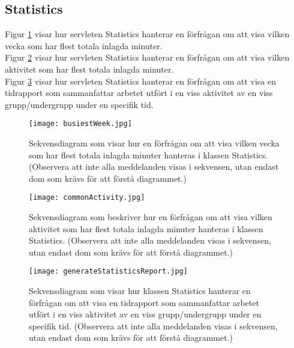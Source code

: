 \documentclass[a4paper]{article}
\begin{document}
\subsection{Statistics}
Figur \ref{busiestWeek} visar hur servleten Statistics hanterar en förfrågan om att visa vilken vecka som har flest totala inlagda minuter.\\
Figur \ref{commonActivity} visar hur servleten Statistics hanterar en förfrågan om att visa vilken aktivitet som har flest totala inlagda minuter.\\
Figur \ref{generateStatisticsReport} visar hur servleten Statistics hanterar en förfrågan om att visa en tidrapport som sammanfattar arbetet utfört i en viss aktivitet av en viss grupp/undergrupp under en specifik tid.

\begin{figure}[h!]
\centering
\texttt{[image: busiestWeek.jpg]}
\caption{Sekvensdiagram som visar hur en förfrågan om att visa vilken vecka som har flest totala inlagda minuter hanteras i klassen Statistics. (Observera att inte alla meddelanden visas i sekvensen, utan endast dom som krävs för att förstå diagrammet.) \label{busiestWeek}}
\end{figure}

\begin{figure}[h!]
\centering
\texttt{[image: commonActivity.jpg]}
\caption{Sekvensdiagram som beskriver hur en förfrågan om att visa vilken aktivitet som har flest totala inlagda minuter hanteras i klassen Statistics. (Observera att inte alla meddelanden visas i sekvensen, utan endast dom som krävs för att förstå diagrammet.)\label{commonActivity}}
\end{figure}

\begin{figure}[h!]
\centering
\texttt{[image: generateStatisticsReport.jpg]}
\caption{Sekvensdiagram som visar hur klassen Statistics hanterar en förfrågan om att visa en tidrapport som sammanfattar arbetet utfört i en viss aktivitet av en viss grupp/undergrupp under en specifik tid. (Observera att inte alla meddelanden visas i sekvensen, utan endast dom som krävs för att förstå diagrammet.) \label{generateStatisticsReport}}
\end{figure}
\end{document}
